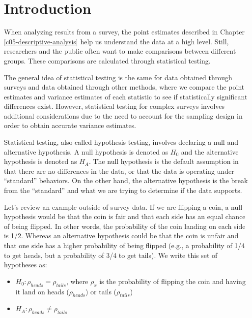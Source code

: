 \documentclass[
]{krantz}
\providecommand{\tightlist}{%
  \setlength{\itemsep}{0pt}\setlength{\parskip}{0pt}}
\begin{document}
\hypertarget{introduction-5}{%
\section{Introduction}\label{introduction-5}}

When analyzing results from a survey, the point estimates described in Chapter \ref{c05-descriptive-analysis} help us understand the data at a high level. Still, researchers and the public often want to make comparisons between different groups. These comparisons are calculated through statistical testing.

The general idea of statistical testing is the same for data obtained through surveys and data obtained through other methods, where we compare the point estimates and variance estimates of each statistic to see if statistically significant differences exist. However, statistical testing for complex surveys involves additional considerations due to the need to account for the sampling design in order to obtain accurate variance estimates.

Statistical testing, also called hypothesis testing, involves declaring a null and alternative hypothesis. A null hypothesis is denoted as \(H_0\) and the alternative hypothesis is denoted as \(H_A\). The null hypothesis is the default assumption in that there are no differences in the data, or that the data is operating under ``standard'' behaviors. On the other hand, the alternative hypothesis is the break from the ``standard'' and what we are trying to determine if the data supports.

Let's review an example outside of survey data. If we are flipping a coin, a null hypothesis would be that the coin is fair and that each side has an equal chance of being flipped. In other words, the probability of the coin landing on each side is 1/2. Whereas an alternative hypothesis could be that the coin is unfair and that one side has a higher probability of being flipped (e.g., a probability of 1/4 to get heads, but a probability of 3/4 to get tails). We write this set of hypotheses as:

\begin{itemize}
\tightlist
\item
  \(H_0: \rho_{heads} = \rho_{tails}\), where \(\rho_{x}\) is the probability of flipping the coin and having it land on heads (\(\rho_{heads}\)) or tails (\(\rho_{tails}\))
\item
  \(H_A: \rho_{heads} \neq \rho_{tails}\)
\end{itemize}
\end{document}
